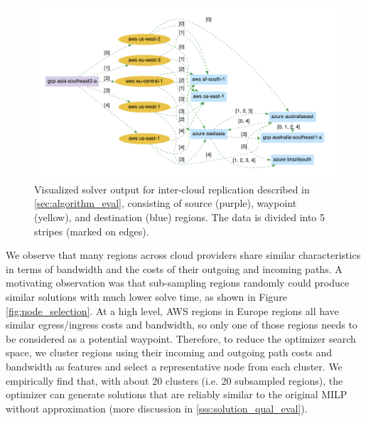 \begin{figure}[tbp]
     \centering
     \includegraphics[width=\linewidth]{figures/partitions.pdf}
     \caption{Visualized solver output for inter-cloud replication described in \cref{sec:algorithm_eval}, consisting of source (purple), waypoint (yellow), and destination (blue) regions. The data is divided into 5 stripes (marked on edges). }
     \label{fig:example-topo}
\end{figure}

\label{node-filtering}
We observe that many regions across cloud providers share similar characteristics in terms of bandwidth and the costs of their outgoing and incoming paths. A motivating observation was that sub-sampling regions randomly could produce similar solutions with much lower solve time, as shown in Figure \ref{fig:node_selection}. At a high level, AWS regions in Europe regions all have similar egress/ingress costs and bandwidth, so only one of those regions needs to be considered as a potential waypoint. Therefore, to reduce the optimizer search space, we cluster regions using their incoming and outgoing path costs and bandwidth as features and select a representative node from each cluster. We empirically find that, with about 20 clusters (i.e. 20 subsampled regions), the optimizer can generate solutions that are reliably similar to the original MILP without approximation (more discussion in \cref{sss:solution_qual_eval}). 


